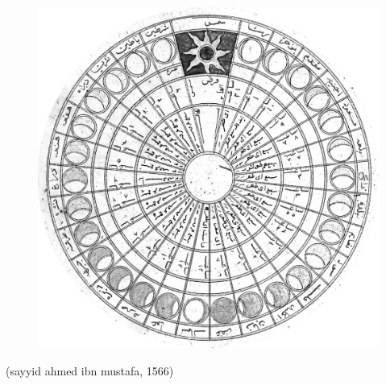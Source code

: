 \documentclass[12pt,a4paper,british,landscape]{article}
\begin{document}
\begin{figure}[h]
    \vspace{0.95cm}
    \begin{center}
        \includegraphics[scale=0.217]{img.jpeg}
    \end{center}
\end{figure}

\begin{center}
    (sayyid ahmed ibn mustafa, 1566)
\end{center}
\end{document}
